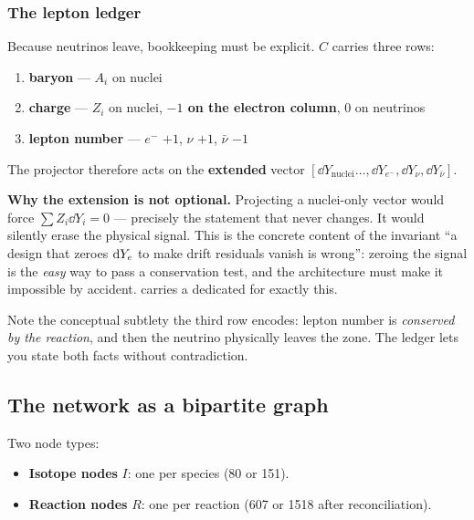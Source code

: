 \subsubsection{The lepton ledger}
\label{sec:leptonledger}

Because neutrinos leave, bookkeeping must be explicit. $C$ carries three rows:

\begin{enumerate}
\item \textbf{baryon} --- $A_i$ on nuclei
\item \textbf{charge} --- $Z_i$ on nuclei, \textbf{$-1$ on the electron
      column}, 0 on neutrinos
\item \textbf{lepton number} --- $e^-$ $+1$, $\nu$ $+1$, $\bar\nu$ $-1$
\end{enumerate}

The projector therefore acts on the \textbf{extended} vector
$[\dd Y_{\text{nuclei}}\ldots, \dd Y_{e^-}, \dd Y_\nu, \dd Y_{\bar\nu}]$.

\textbf{Why the extension is not optional.} Projecting a nuclei-only vector
would force $\sum Z_i \dd Y_i = 0$ --- precisely the statement that \Ye{} never
changes. It would silently erase the physical signal. This is the concrete
content of the invariant ``a design that zeroes $\mathrm{d}Y_{e}$ to make drift residuals
vanish is wrong'': zeroing the signal is the \emph{easy} way to pass a
conservation test, and the architecture must make it impossible by accident.
 carries a dedicated
 for exactly this.

Note the conceptual subtlety the third row encodes: lepton number is
\emph{conserved by the reaction}, and then the neutrino physically leaves the
zone. The ledger lets you state both facts without contradiction.

\subsection{The network as a bipartite graph}
\label{sec:bipartite}

Two node types:

\begin{itemize}
\item \textbf{Isotope nodes} $I$: one per species (80 or 151).
\item \textbf{Reaction nodes} $R$: one per reaction (607 or 1518 after
      reconciliation).
\end{itemize}

